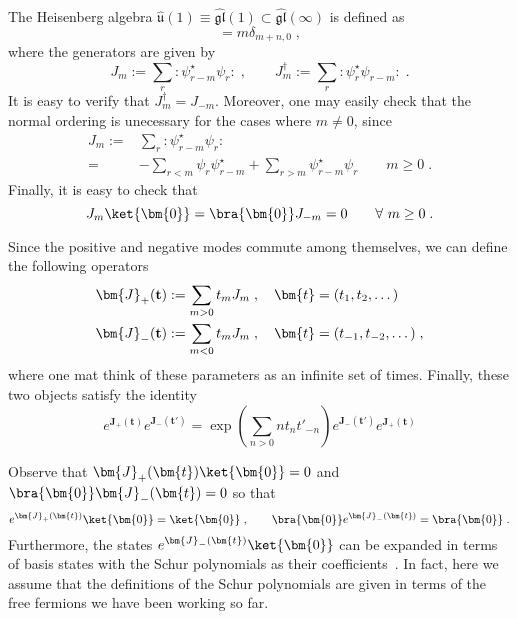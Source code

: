 The Heisenberg algebra \(\hat{\mathfrak{u}}(1) \equiv
\widehat{\mathfrak{gl}}(1) \subset \widehat{\mathfrak{gl}}(\infty) \)
is defined as
\begin{equation}
[J_m , J_n]  =m \delta_{m+n,0}\; ,
\end{equation} 
where the generators are given by
\begin{equation}
J_m := \sum_r  :\psi_{r-m}^\star \psi_r :\; , 
\qquad 
J_m^\dagger := \sum_r :\psi_r^\star \psi_{r-m}:\;. 
\end{equation} 
It is easy to verify that \(J^\dagger_m = J_{-m}\). Moreover, one may easily check
that the normal ordering is unecessary for the cases where \(m\neq 0\), since
\begin{equation}
\begin{split}
J_m := &\sum_r :\psi_{r-m}^\star \psi_r: \\
= & - \sum_{r<m} \psi_r \psi_{r-m}^\star + \sum_{r>m} \psi_{r-m}^\star \psi_r  \qquad m\geq 0\; .
\end{split}
\end{equation} 	
Finally, it is easy to check that
\begin{equation}
J_m \ket{\bm{0}}= \bra{\bm{0}} J_{-m}=0 \qquad \forall \ m\geq 0\; .
\end{equation}

Since the positive and negative modes commute among themselves, we can
define the following operators
\begin{equation}
\begin{split}
\bm{J}_+({\bf t}) & :=\sum_{m>0}t_m  J_m\; ,\quad  \bm{t}=(t_1, t_2, \dots )\\
\bm{J}_-({\bf t}) & :=\sum_{m<0}t_m  J_m\; ,\quad  \bm{t}=(t_{-1}, t_{-2}, \dots )\; ,
\end{split}
\end{equation}
where one mat think of these parameters as an infinite set of
times. Finally, these two objects satisfy the identity
\begin{equation}
\label{v-ope}
\boxed{
  e^{\bm{J}_{+}(\bm{t})}e^{\bm{J}_{-}(\bm{t}')}
  = \exp\left( \sum_{n>0} n t_n t'_{-n} \right) e^{\bm{J}_{-}(\bm{t}')} e^{\bm{J}_{+}(\bm{t})}}
\end{equation}

Observe that \(\bm{J}_+(\bm{t}) \ket{\bm{0}}=0 \) and \(
\bra{\bm{0}} \bm{J}_-(\bm{t})=0 \) so that
\begin{equation}
e^{\bm{J}_+(\bm{t})} \ket{\bm{0}}= \ket{\bm{0}} \; , \qquad
 \bra{\bm{0}} e^{\bm{J}_-(\bm{t})} = \bra{\bm{0}}\; .
\end{equation}
Furthermore, the states \(e^{\bm{J}_-(\bm{t})}\ket{\bm{0}}\) can be
expanded in terms of basis states with the Schur polynomials as their
coefficients~\cite{Alexandrov:2012tr}. In fact, here we assume that
the definitions of the Schur polynomials are given in terms of the
free fermions we have been working so far. 

